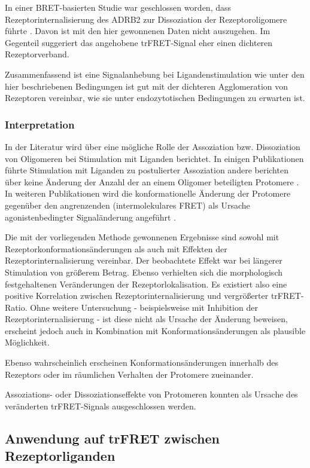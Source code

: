 In einer BRET-basierten Studie war geschlossen worden, dass Rezeptorinternalisierung des ADRB2 zur Dissoziation der Rezeptoroligomere führte \parencite{Lan2011}. Davon ist mit den hier gewonnenen Daten nicht auszugehen. Im Gegenteil suggeriert das angehobene trFRET-Signal eher einen dichteren Rezeptorverband.

Zusammenfassend ist eine Signalanhebung bei Ligandenstimulation wie unter den hier beschriebenen Bedingungen ist gut mit der dichteren Agglomeration von Rezeptoren vereinbar, wie sie unter endozytotischen Bedingungen zu erwarten ist.  

\subsubsection{Interpretation}
In der Literatur wird über eine mögliche Rolle der Assoziation bzw. Dissoziation von Oligomeren bei Stimulation mit Liganden berichtet. In einigen Publikationen führte Stimulation mit Liganden zu postulierter Assoziation \parencite{Angers2000} andere berichten über keine Änderung der Anzahl der an einem Oligomer beteiligten Protomere \parencite{Dorsch2009}. In weiteren Publikationen wird die konformationelle Änderung der Protomere gegenüber den angrenzenden (intermolekulares FRET) als Ursache agonistenbedingter Signaländerung angeführt \parencite{Fung2009}. 

Die mit der vorliegenden Methode gewonnenen Ergebnisse sind sowohl mit Rezeptorkonformationsänderungen als auch mit Effekten der Rezeptorinternalisierung vereinbar. Der beobachtete Effekt war bei längerer Stimulation von größerem Betrag. Ebenso verhielten sich die morphologisch festgehaltenen Veränderungen der Rezeptorlokalisation. Es existiert also eine positive Korrelation zwischen Rezeptorinternalisierung und vergrößerter trFRET-Ratio. Ohne weitere Untersuchung - beispielsweise mit Inhibition der Rezeptorinternalisierung - ist diese nicht als Ursache der Änderung beweisen, erscheint jedoch auch in Kombination mit Konformationsänderungen als plausible Möglichkeit. 

Ebenso wahrscheinlich erscheinen Konformationsänderungen innerhalb des Rezeptors oder im räumlichen Verhalten der Protomere zueinander. 

Assoziations- oder Dissoziationseffekte von Protomeren konnten als Ursache des veränderten trFRET-Signals ausgeschlossen werden. 

\subsection{Anwendung auf trFRET zwischen Rezeptorliganden}


